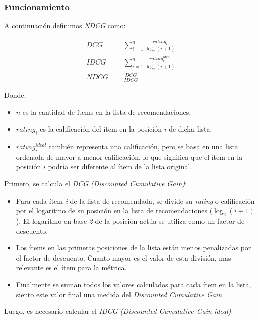 \documentclass[11pt,a4paper,twoside]{thesis}
\begin{document}
\subsubsection{Funcionamiento}

A continuación definimos \textit{NDCG} como:

\begin{equation}
	\begin{split}
		DCG  & = \sum_{i=1}^{n} \frac{rating_i}{\log_2(i + 1)}         \\
		IDCG & = \sum_{i=1}^{n} \frac{rating_i^{ideal}}{\log_2(i + 1)} \\
		NDCG & = \frac{DCG}{IDCG}
	\end{split}
\end{equation}

Donde:
\begin{itemize}
	\item $n$ es la cantidad de ítems en la lista de recomendaciones.
	\item $rating_i$ es la calificación del ítem en la posición $i$ de dicha lista.
	\item $rating_i^{ideal}$ también representa una calificación, pero se basa en una lista ordenada de mayor a menor calificación, lo que significa que el ítem en la posición $i$ podría ser diferente al ítem de la lista original.
\end{itemize}

Primero, se calcula el \textit{DCG (Discounted Cumulative Gain)}:

\begin{itemize}
	\item Para cada ítem \textit{i} de la lista de recomendada, se divide su \textit{rating} o calificación por el logaritmo de su posición en la lista de recomendaciones ($\log_2(i + 1)$). El logaritmo en base \textit{2} de la posición actúa se utiliza como un factor de descuento.
	\item Los ítems en las primeras posiciones de la lista están menos penalizadas por el factor de descuento. Cuanto mayor es el valor de esta división, mas relevante es el ítem para la métrica.
	\item Finalmente se suman todos los valores calculados para cada ítem en la lista, siento este valor final una medida del \textit{Discounted Cumulative Gain}.
\end{itemize}

Luego, es necesario calcular el \textit{IDCG (\textit{Discounted Cumulative Gain} ideal)}:
\end{document}
